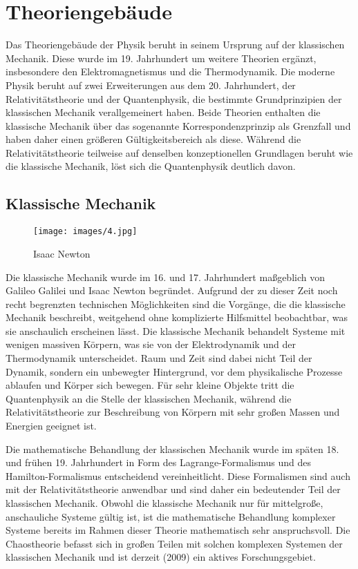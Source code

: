 \documentclass[titlepage, parkskip=full, twocolumn, landscape]{scrartcl}
\begin{document}
\section{Theoriengebäude}

Das Theoriengebäude der Physik beruht in seinem Ursprung auf der klassischen Mechanik. Diese wurde im 19. Jahrhundert um weitere Theorien ergänzt, insbesondere den Elektromagnetismus und die Thermodynamik. Die moderne Physik beruht auf zwei Erweiterungen aus dem 20. Jahrhundert, der Relativitätstheorie und der Quantenphysik, die bestimmte Grundprinzipien der klassischen Mechanik verallgemeinert haben. Beide Theorien enthalten die klassische Mechanik über das sogenannte Korrespondenzprinzip als Grenzfall und haben daher einen größeren Gültigkeitsbereich als diese. Während die Relativitätstheorie teilweise auf denselben konzeptionellen Grundlagen beruht wie die klassische Mechanik, löst sich die Quantenphysik deutlich davon.

\subsection{Klassische Mechanik}

\begin{figure}
	\centering
	\texttt{[image: images/4.jpg]}
	\caption{Isaac Newton}
\end{figure}

Die klassische Mechanik wurde im 16. und 17. Jahrhundert maßgeblich von Galileo Galilei und Isaac Newton begründet. Aufgrund der zu dieser Zeit noch recht begrenzten technischen Möglichkeiten sind die Vorgänge, die die klassische Mechanik beschreibt, weitgehend ohne komplizierte Hilfsmittel beobachtbar, was sie anschaulich erscheinen lässt. Die klassische Mechanik behandelt Systeme mit wenigen massiven Körpern, was sie von der Elektrodynamik und der Thermodynamik unterscheidet. Raum und Zeit sind dabei nicht Teil der Dynamik, sondern ein unbewegter Hintergrund, vor dem physikalische Prozesse ablaufen und Körper sich bewegen. Für sehr kleine Objekte tritt die Quantenphysik an die Stelle der klassischen Mechanik, während die Relativitätstheorie zur Beschreibung von Körpern mit sehr großen Massen und Energien geeignet ist.

Die mathematische Behandlung der klassischen Mechanik wurde im späten 18. und frühen 19. Jahrhundert in Form des Lagrange-Formalismus und des Hamilton-Formalismus entscheidend vereinheitlicht. Diese Formalismen sind auch mit der Relativitätstheorie anwendbar und sind daher ein bedeutender Teil der klassischen Mechanik. Obwohl die klassische Mechanik nur für mittelgroße, anschauliche Systeme gültig ist, ist die mathematische Behandlung komplexer Systeme bereits im Rahmen dieser Theorie mathematisch sehr anspruchsvoll. Die Chaostheorie befasst sich in großen Teilen mit solchen komplexen Systemen der klassischen Mechanik und ist derzeit (2009) ein aktives Forschungsgebiet.
\end{document}
